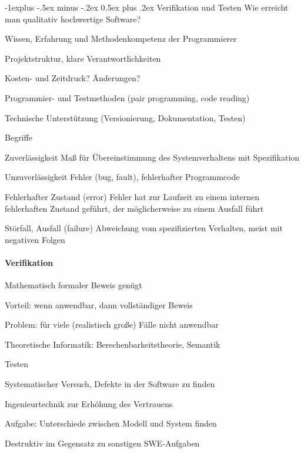 \documentclass[a4paper]{article}
\makeatletter
\renewcommand{\subsection}{\@startsection{subsection}{2}{0mm}%
                                {-1explus -.5ex minus -.2ex}%
                                {0.5ex plus .2ex}%
                                {\normalfont\normalsize\bfseries}}
\makeatother
\begin{document}
\begin{multicols}{3}
  \subsection{Verifikation und Testen}
  Wie erreicht man qualitativ hochwertige Software?
  \begin{itemize*}
    \item Wissen, Erfahrung und Methodenkompetenz der Programmierer
    \item Projektstruktur, klare Verantwortlichkeiten
    \item Kosten- und Zeitdruck? Änderungen?
    \item Programmier- und Testmethoden (pair programming, code reading)
    \item Technische Unterstützung (Versionierung, Dokumentation, Testen)
  \end{itemize*}

  Begriffe
  \begin{description*}
    \item[Zuverlässigkeit] Maß für Übereinstimmung des Systemverhaltens mit Spezifikation
    \item[Unzuverlässigkeit] Fehler (bug, fault), fehlerhafter Programmcode
    \item[Fehlerhafter Zustand (error)] Fehler hat zur Laufzeit zu einem internen fehlerhaften Zustand geführt, der möglicherweise zu einem Ausfall führt
    \item[Störfall, Ausfall (failure)] Abweichung vom spezifizierten Verhalten, meist mit negativen Folgen
  \end{description*}

  \paragraph{Verifikation}
  \begin{itemize*}
    \item Mathematisch formaler Beweis genügt
    \item Vorteil: wenn anwendbar, dann vollständiger Beweis
    \item Problem: für viele (realistisch große) Fälle nicht anwendbar
    \item Theoretische Informatik: Berechenbarkeitstheorie, Semantik
  \end{itemize*}

  Testen
  \begin{itemize*}
    \item Systematischer Versuch, Defekte in der Software zu finden
    \item Ingenieurtechnik zur Erhöhung des Vertrauens
    \item Aufgabe: Unterschiede zwischen Modell und System finden
    \item Destruktiv im Gegensatz zu sonstigen SWE-Aufgaben
  \end{itemize*}


\end{multicols}
\end{document}
